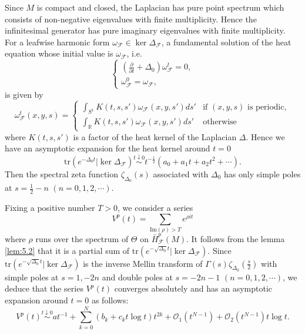 Since $M$ is compact and closed, the Laplacian has pure point spectrum which consists of non-negative eigenvalues with finite multiplicity.
Hence the infinitesimal generator has pure imaginary eigenvalues with finite multiplicity.\\

For a leafwise harmonic form $\omega_{\mathcal{F}}\in\ker\Delta_{\mathcal{F}}$, a fundamental solution of the heat equation whose initial value is $\omega_{\mathcal{F}}$, i.e.
\begin{equation*}
    \begin{cases}
        \left(\frac{\partial}{\partial{t}} + \Delta_{0} \right) \omega_{\mathcal{F}}^{t} = 0, \\
        \omega_{\mathcal{F}}^{0} = \omega_{\mathcal{F}},
    \end{cases}
\end{equation*}
is given by
\begin{equation*}
        \omega_{\mathcal{F}}^{t}(x,y,s) =
        \begin{cases}
            \int_{S^{1}} K(t,s,s')\omega_{\mathcal{F}}(x,y,s')ds' & \text{if } (x,y,s) \text{ is periodic},\\
            \int_{\mathbb{R}} K(t,s,s')\omega_{\mathcal{F}}(x,y,s')ds' & \text{otherwise}
        \end{cases}
\end{equation*}
where $K(t,s,s')$ is a factor of the heat kernel of the Laplacian $\Delta$.
Hence we have an asymptotic expansion for the heat kernel around $t=0$
\begin{equation*}
    \mathrm{tr}(e^{-\Delta_{0}t}|\ker\Delta_{\mathcal{F}}) \overset{t\downarrow0}{\sim} t^{-\frac{1}{2}}(a_{0} + a_{1}t + a_{2}t^{2} + \cdots).
\end{equation*}
Then the spectral zeta function $\zeta_{\Delta_{0}}(s)$ associated with $\Delta_{0}$ has only simple poles at $s=\frac{1}{2}-n$ $(n=0,1,2, \cdots)$.

Fixing a positive number $T>0$, we consider a series
\begin{equation*}
    V^{p}(t) = \sum_{\text{Im}(\rho)>T} e^{\rho{it}}
\end{equation*}
where $\rho$ runs over the spectrum of $\Theta$ on $\bar{H}_{\mathcal{F}}^{p}(M)$.
It follows from the lemma \ref{lem:5.2} that it is a partial sum of $\mathrm{tr}(e^{-\sqrt{\Delta_{0}}t}|\ker\Delta_{\mathcal{F}})$.
Since $\mathrm{tr}(e^{-\sqrt{\Delta_{0}}t}|\ker\Delta_{\mathcal{F}})$ is the inverse Mellin transform of $\Gamma(s)\zeta_{\Delta_{0}}(\frac{s}{2})$ with simple poles at $s=1, -2n$  and double poles at $s=-2n-1$ $(n=0,1,2,\cdots)$, we deduce that the series $V^{p}(t)$ converges absolutely and has an asymptotic expansion around $t=0$ as follows:
\begin{equation*}
    V^{p}(t) \overset{t\downarrow0}{\sim} at^{-1} + \sum_{k=0}^{N} (b_{k} + c_{k}{t}\log{t})t^{2k} + \mathcal{O}_{1}(t^{N-1}) + \mathcal{O}_{2}(t^{N-1})t\log{t}.
\end{equation*}
